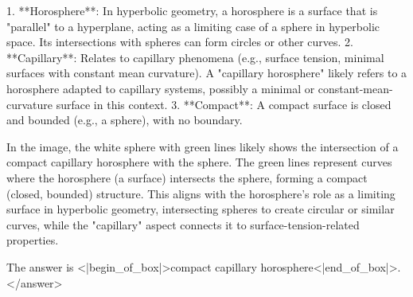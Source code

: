 1. **Horosphere**: In hyperbolic geometry, a horosphere is a surface that is "parallel" to a hyperplane, acting as a limiting case of a sphere in hyperbolic space. Its intersections with spheres can form circles or other curves.  
2. **Capillary**: Relates to capillary phenomena (e.g., surface tension, minimal surfaces with constant mean curvature). A "capillary horosphere" likely refers to a horosphere adapted to capillary systems, possibly a minimal or constant-mean-curvature surface in this context.  
3. **Compact**: A compact surface is closed and bounded (e.g., a sphere), with no boundary.  

In the image, the white sphere with green lines likely shows the intersection of a compact capillary horosphere with the sphere. The green lines represent curves where the horosphere (a surface) intersects the sphere, forming a compact (closed, bounded) structure. This aligns with the horosphere’s role as a limiting surface in hyperbolic geometry, intersecting spheres to create circular or similar curves, while the "capillary" aspect connects it to surface-tension-related properties.  

The answer is <|begin_of_box|>compact capillary horosphere<|end_of_box|>.</answer>